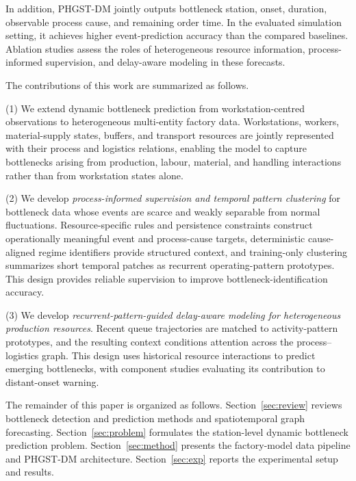 \documentclass[a4paper,fleqn]{cas-dc}
\begin{document}
In addition, PHGST-DM jointly outputs bottleneck station, onset, duration, observable process cause, and remaining order time. In the evaluated simulation setting, it achieves higher event-prediction accuracy than the compared baselines. Ablation studies assess the roles of heterogeneous resource information, process-informed supervision, and delay-aware modeling in these forecasts.

The contributions of this work are summarized as follows.

(1) We extend dynamic bottleneck prediction from workstation-centred observations to heterogeneous multi-entity factory data. Workstations, workers, material-supply states, buffers, and transport resources are jointly represented with their process and logistics relations, enabling the model to capture bottlenecks arising from production, labour, material, and handling interactions rather than from workstation states alone.

(2) We develop \emph{process-informed supervision and temporal pattern clustering} for bottleneck data whose events are scarce and weakly separable from normal fluctuations. Resource-specific rules and persistence constraints construct operationally meaningful event and process-cause targets, deterministic cause-aligned regime identifiers provide structured context, and training-only clustering summarizes short temporal patches as recurrent operating-pattern prototypes. This design provides reliable supervision to improve bottleneck-identification accuracy.

(3) We develop \emph{recurrent-pattern-guided delay-aware modeling for heterogeneous production resources}. Recent queue trajectories are matched to activity-pattern prototypes, and the resulting context conditions attention across the process--logistics graph. This design uses historical resource interactions to predict emerging bottlenecks, with component studies evaluating its contribution to distant-onset warning.

The remainder of this paper is organized as follows. Section~\ref{sec:review} reviews bottleneck detection and prediction methods and spatiotemporal graph forecasting. Section~\ref{sec:problem} formulates the station-level dynamic bottleneck prediction problem. Section~\ref{sec:method} presents the factory-model data pipeline and PHGST-DM architecture. Section~\ref{sec:exp} reports the experimental setup and results.

\end{document}
